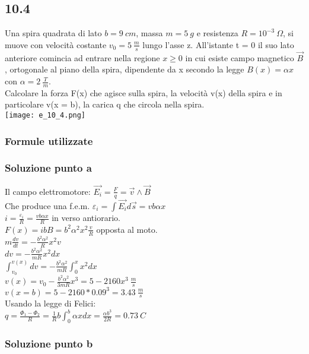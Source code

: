 \documentclass[../../main.tex]{subfiles}
\begin{document}
\subsection*{10.4}
Una spira quadrata di lato $b=9\ cm$, massa $m = 5\ g$ e resistenza $R=10^{-3}\ \Omega$, si muove con velocità costante $v_0 = 5\ \frac{m}{s}$ lungo l'asse z. All'istante t = 0 il suo lato anteriore comincia ad entrare nella regione $x\ge0$ in cui esiste campo magnetico $\vec{B}$, ortogonale al piano della spira, dipendente da x secondo la legge $B(x) = \alpha x$ con $\alpha = 2\ \frac{T}{m}$.\\
Calcolare la forza F(x) che agisce sulla spira, la velocità v(x) della spira e in particolare v(x = b), la carica q che circola nella spira.\\
\texttt{[image: e\_10\_4.png]}
\subsubsection*{Formule utilizzate}
\subsubsection*{Soluzione punto a}
Il campo elettromotore: $\vec{E_i} = \frac{F}{q} = \vec{v}\wedge\vec{B}$\\
Che produce una f.e.m. $\varepsilon_i = \int \vec{E_i} d\vec{s} = vb\alpha x$\\
$i = \frac{\varepsilon_i}{R} = \frac{vb\alpha x}{R}$ in verso antiorario.\\
$F(x) = ibB = b^2\alpha^2x^2\frac{v}{R}$ opposta al moto.\\
$m\frac{dv}{dt} = - \frac{b^2\alpha^2}{R}x^2v$\\
$dv = -\frac{b^2\alpha^2}{mR}x^2 dx$\\
$\int_{v_0}^{v(x)}dv = -\frac{b^2\alpha^2}{mR}\int^x_0x^2dx$\\
$v(x) = v_0 - \frac{b^2\alpha^2}{3mR}x^3=5-2160x^3\ \frac{m}{s}$\\
$v(x = b) = 5-2160 * 0.09^3 = 3.43\ \frac{m}{s}$\\
Usando la legge di Felici:\\
$q = \frac{\Phi_1 - \Phi_2}{R} = \frac{1}{R}b\int_0^b\alpha x dx=\frac{\alpha b^3}{2R} = 0.73\ C$\\
\subsubsection*{Soluzione punto b}
\newpage
\end{document}
